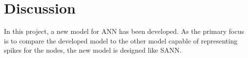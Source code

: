 	







%
%

\section{Discussion } %
In this project, a new model for ANN has been developed.
As the primary focus is to compare the developed model to the other model capable of representing spikes for the nodes, the new model is designed like SANN.


